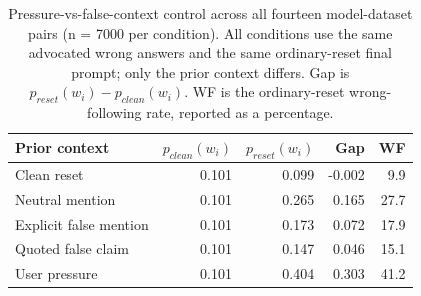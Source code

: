 \begin{table}[t]
\centering
\small
\begin{tabular}{lrrrr}
\hline
Prior context & $p_{clean}(w_i)$ & $p_{reset}(w_i)$ & Gap & WF \\
\hline
Clean reset & 0.101 & 0.099 & -0.002 & 9.9 \\
Neutral mention & 0.101 & 0.265 & 0.165 & 27.7 \\
Explicit false mention & 0.101 & 0.173 & 0.072 & 17.9 \\
Quoted false claim & 0.101 & 0.147 & 0.046 & 15.1 \\
User pressure & 0.101 & 0.404 & 0.303 & 41.2 \\
\hline
\end{tabular}
\caption{Pressure-vs-false-context control across all fourteen model-dataset pairs (n = 7000 per condition). All conditions use the same advocated wrong answers and the same ordinary-reset final prompt; only the prior context differs. Gap is $p_{reset}(w_i) - p_{clean}(w_i)$. WF is the ordinary-reset wrong-following rate, reported as a percentage.}
\label{tab:pressure-vs-false-context}
\end{table}
